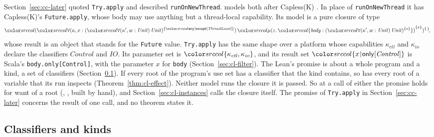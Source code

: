Section~\ref{sec:cc-later} quoted \lstinline{Try.apply} and described \lstinline{runOnNewThread}. \treeCL models both after Capless(K) \cite{pham2026classifying}. In place of \lstinline{runOnNewThread} it has Capless(K)'s \lstinline{Future.apply}, whose body may use anything but a thread-local capability. Its model is a pure closure of type
\[
\src{\capt{(\dall{\kappa, x}{\capt{(\dall{\kappa', w}{\Unit}{\Unit})}{\cset{\restr{\cany}{\kexcept{\mathit{ThreadLocal}}}}}}{\capt{\dmu{z}{\dfld{\mathit{body}}{\capt{(\dall{\kappa', w}{\Unit}{\Unit})}{\cset{z}}}}}{\cset{x}}})}{\cempty}}\!,
\]
whose result is an object that stands for the \lstinline{Future} value. \lstinline{Try.apply} has the same shape over a platform whose capabilities $\kappa_{\mathit{ctl}}$ and $\kappa_{\mathit{io}}$ declare the classifiers $\mathit{Control}$ and $\mathit{IO}$. Its parameter set is $\src{\cset{\kappa_{\mathit{ctl}}, \kappa_{\mathit{io}}}}$, and its result set $\src{\cset{\restr{x}{\konly{\mathit{Control}}}}}$ is Scala's \lstinline{body.only[Control]}, with the parameter $x$ for \lstinline{body} (Section~\ref{sec:cl-filter}). The Lean's promise is about a whole program and a kind, a set of classifiers (Section~\ref{sec:cl-kinds}). If every root of the program's use set has a classifier that the kind contains, so has every root of a variable that its run inspects (Theorem~\ref{thm:cl-effect}). Neither model runs the closure it is passed. So at a call of either the promise holds for want of a root (, , built by hand), and Section~\ref{sec:cl-instances} calls the closure itself. The promise of \lstinline{Try.apply} in Section~\ref{sec:cc-later} concerns the result of one call, and no theorem states it.

\subsection{Classifiers and kinds}\label{sec:cl-kinds}

